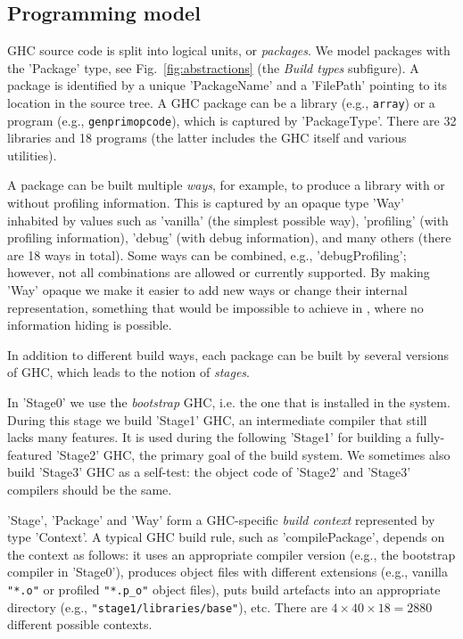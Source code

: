 \subsection{Programming model}

GHC source code is split into logical units, or \emph{packages}. We model
packages with the \lst'Package' type, see Fig.~\ref{fig:abstractions}
(the \emph{Build types} subfigure). A package is identified by a unique
\lst'PackageName' and a \lst'FilePath' pointing to its location in the source
tree. A GHC package can be a library (e.g., \texttt{array}) or a program (e.g.,
\texttt{genprimopcode}), which is captured by \lst'PackageType'. There are 32
libraries and 18 programs (the latter includes the GHC itself and various
utilities).

A package can be built multiple \emph{ways}, for example, to produce a library
with or without profiling information. This is captured by an opaque
type \lst'Way' inhabited by values such as \lst'vanilla' (the simplest
possible way), \lst'profiling' (with profiling information), \lst'debug'
(with debug information), and many others (there are 18 ways in total). Some
ways can be combined, e.g., \lst'debugProfiling'; however, not all combinations
are allowed or currently supported. By making \lst'Way' opaque we make it easier
to add new ways or change their internal representation, something that would be
impossible to achieve in \make{}, where no information hiding is possible. 

In addition to different build ways, each package can be built by several
versions of GHC, which leads to the notion of \emph{stages}.

In \lst'Stage0' we use the \emph{bootstrap} GHC, i.e. the one that is
installed in the system. During this stage we build \lst'Stage1' GHC, an
intermediate compiler that still lacks many features. It is used during the
following \lst'Stage1' for building a fully-featured \lst'Stage2' GHC, the
primary goal of the build system. We sometimes also build \lst'Stage3' GHC as
a self-test: the object code of \lst'Stage2' and \lst'Stage3' compilers
should be the same.

\lst'Stage', \lst'Package' and \lst'Way' form a GHC-specific
\emph{build context} represented by type \lst'Context'. A typical GHC build
rule, such as \lst'compilePackage', depends on the context as follows: it
uses an appropriate compiler version (e.g., the bootstrap compiler in
\lst'Stage0'), produces object files with different extensions (e.g., vanilla
\texttt{"*.o"} or profiled \texttt{"*.p\_o"} object files), puts build artefacts
into an appropriate directory (e.g., \texttt{"stage1/libraries/base"}), etc.
There are $4 \times 40 \times 18 = 2880$ different possible contexts.

